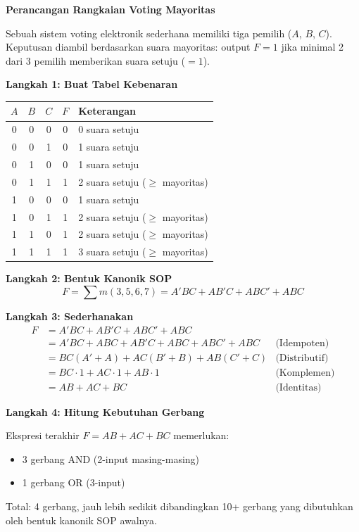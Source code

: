 \begin{contoh}
\textbf{Perancangan Rangkaian Voting Mayoritas}

Sebuah sistem voting elektronik sederhana memiliki tiga pemilih ($A$, $B$, $C$). Keputusan diambil berdasarkan suara mayoritas: output $F = 1$ jika minimal 2 dari 3 pemilih memberikan suara setuju ($= 1$).

\textbf{Langkah 1: Buat Tabel Kebenaran}

\begin{center}
\begin{tabular}{|c|c|c||c|l|}
\hline
$A$ & $B$ & $C$ & $F$ & \textbf{Keterangan} \\ \hline
0 & 0 & 0 & 0 & 0 suara setuju \\ \hline
0 & 0 & 1 & 0 & 1 suara setuju \\ \hline
0 & 1 & 0 & 0 & 1 suara setuju \\ \hline
0 & 1 & 1 & 1 & 2 suara setuju ($\geq$ mayoritas) \\ \hline
1 & 0 & 0 & 0 & 1 suara setuju \\ \hline
1 & 0 & 1 & 1 & 2 suara setuju ($\geq$ mayoritas) \\ \hline
1 & 1 & 0 & 1 & 2 suara setuju ($\geq$ mayoritas) \\ \hline
1 & 1 & 1 & 1 & 3 suara setuju ($\geq$ mayoritas) \\ \hline
\end{tabular}
\end{center}

\textbf{Langkah 2: Bentuk Kanonik SOP}
\[ F = \sum m(3, 5, 6, 7) = A'BC + AB'C + ABC' + ABC \]

\textbf{Langkah 3: Sederhanakan}
\begin{align*}
F &= A'BC + AB'C + ABC' + ABC \\
  &= A'BC + ABC + AB'C + ABC + ABC' + ABC & \text{(Idempoten)} \\
  &= BC(A' + A) + AC(B' + B) + AB(C' + C) & \text{(Distributif)} \\
  &= BC \cdot 1 + AC \cdot 1 + AB \cdot 1 & \text{(Komplemen)} \\
  &= AB + AC + BC & \text{(Identitas)}
\end{align*}

\textbf{Langkah 4: Hitung Kebutuhan Gerbang}

Ekspresi terakhir $F = AB + AC + BC$ memerlukan:
\begin{itemize}
    \item 3 gerbang AND (2-input masing-masing)
    \item 1 gerbang OR (3-input)
\end{itemize}
Total: 4 gerbang, jauh lebih sedikit dibandingkan 10+ gerbang yang dibutuhkan oleh bentuk kanonik SOP awalnya.
\end{contoh}

